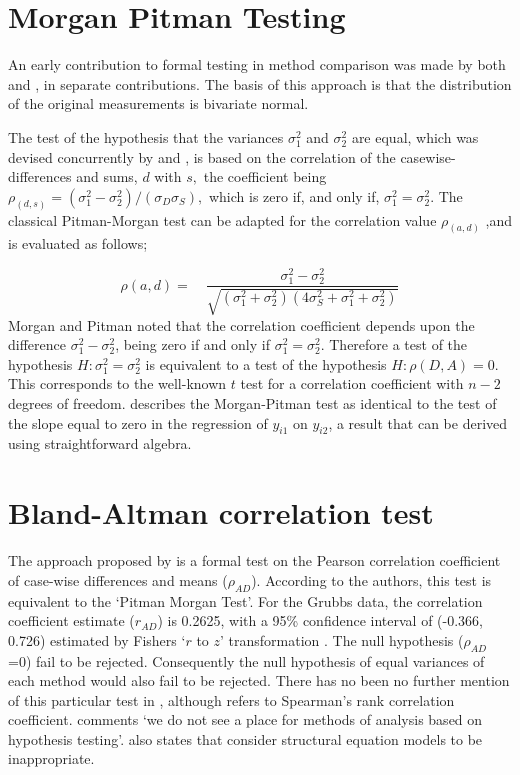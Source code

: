 \documentclass[12pt, a4paper]{report}
\theoremstyle{plain}
\theoremstyle{definition}
\theoremstyle{remark}
\begin{document}
\section{Morgan Pitman Testing}
An early contribution to formal testing in method comparison was
made by both \citet{Morgan} and \citet{Pitman}, in separate
contributions. The basis of this approach is that the
distribution of the original measurements is bivariate normal.

The test of the hypothesis that the variances $\sigma^2_1$ and $\sigma^2_2$ are equal, which was devised concurrently by \citet{Pitman} and \citet{Morgan}, 
is based on the correlation of the casewise-differences and sums, $d$ with $s,$ the coefficient being $ \rho_{(d,s)} = (\sigma^2_1 -\sigma^2_2) / ( \sigma_D \sigma_S ),$ which is zero if, and only
if, $\sigma^2_1 = \sigma^2_2.$ The classical Pitman-Morgan test can be adapted for the correlation value $\rho_{(a,d)}$ ,and
is evaluated as follows;

\begin{equation}
\rho(a,d)=\quad\frac{\sigma^{2}_{1}-\sigma^{2}_{2}}{\sqrt{(\sigma^{2}_{1}+\sigma^{2}_{2})(4\sigma^{2}_{S}+\sigma^{2}_{1}+\sigma^{2}_{2})}}
\end{equation}
Morgan and Pitman noted that the correlation coefficient depends
upon the difference $\sigma^{2}_{1}- \sigma^{2}_{2}$, being zero
if and only if $\sigma^{2}_{1}=\sigma^{2}_{2}$.
Therefore a test of the hypothesis $H: \sigma^{2}_{1}=\sigma^{2}_{2}$ is equivalent to a test of the hypothesis $H: \rho(D,A) = 0$. This corresponds to the well-known
$t$ test for a correlation coefficient with $n-2$ degrees of freedom. \citet{Bartko} describes the Morgan-Pitman test as identical to
the test of the slope equal to zero in the regression of $y_{i1}$ on $y_{i2}$, a result that can be derived using
straightforward algebra.



\section{Bland-Altman correlation test}

The approach proposed by \citet{BA83} is a formal test on the
Pearson correlation coefficient of case-wise differences and means
($\rho_{AD}$). According to the authors, this test is equivalent
to the `Pitman Morgan Test'. For the Grubbs data, the correlation
coefficient estimate ($r_{AD}$) is 0.2625, with a 95\% confidence
interval of (-0.366, 0.726) estimated by Fishers `$r$ to $z$'
transformation \citep*{Cohen}. The null hypothesis ($\rho_{AD}$ =0)
fail to be rejected. Consequently the null hypothesis of equal
variances of each method would also fail to be rejected. There has
no been no further mention of this particular test in
\citet{BA86}, although \citet{BA99} refers to Spearman's rank
correlation coefficient. \citet{BA99} comments `we do not see a
place for methods of analysis based on hypothesis testing'.
\citet{BA99} also states that consider structural equation models
to be inappropriate.
\end{document}
